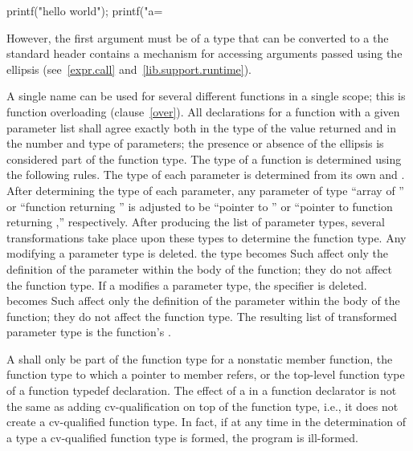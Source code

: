 \begin{codeblock}
printf("hello world");
printf("a=%
\end{codeblock}

However, the first argument must be of a type
that can be converted to a
\exitexample
\enternote
the standard header
%
contains a mechanism for accessing arguments passed using the ellipsis
(see~\ref{expr.call} and~\ref{lib.support.runtime}).
\exitnote

\pnum
{}%
%
A single name can be used for several different functions in a single scope;
this is function overloading (clause~\ref{over}).
All declarations for a function with a given parameter list shall agree exactly
both in the type of the value returned and in the number and type of
parameters; the presence or absence of the ellipsis is considered part of the
function type.
The type of a function is determined using the following rules.
The type of each parameter is
determined from its own
and
.
After determining the type of each parameter, any parameter of type ``array of
%
%
''
%
%
or ``function returning
''
is adjusted to be ``pointer to
''
or ``pointer to function returning
,''
respectively.
After producing the list of parameter types,
several transformations take place upon these types to determine the function
type. Any
modifying a parameter type is deleted.
\enterexample
the type  becomes 
\exitexampleb
Such  affect only the definition of the
parameter within the body of the function; they do not affect the function
type. If a  modifies a parameter type,
the specifier is deleted.
\enterexample
{} becomes 
\exitexampleb
Such  affect only the definition
of the parameter within the body of the function; they do not affect the
function type. The resulting list of transformed parameter type is the
function's .

\pnum
A
shall only be part of
the function type for a nonstatic member function,
the function type to which a pointer to member refers,
or the top-level function type of a function typedef declaration.
The effect of a
in a function declarator is not the same as
adding cv-qualification on top of the function type, i.e., it does not
create a cv-qualified function type.
In fact, if at any time in the determination of a type a cv-qualified
function type is formed, the program is ill-formed.
\enterexample

